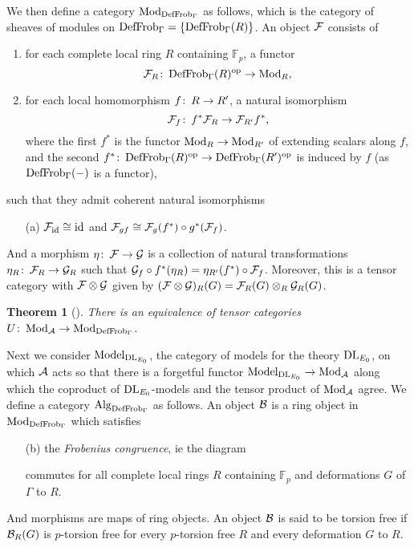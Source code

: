 \documentclass{gtpart}
\newtheorem{thm}{Theorem}
\theoremstyle{definition}
\theoremstyle{remark}
\def\co{\colon\thinspace}
\newcommand{\mb}[1]{\mathbb{#1}}
\newcommand{\DL}{{\rm DL}}
\newcommand{\CA}{{\cal A}}
\newcommand{\Mod}{{\rm Mod}}
\newcommand{\Alg}{{\rm Alg}}
\newcommand{\Frob}{{\rm Frob}}
\newcommand{\DF}{{{\rm DefFrob}_\Gamma}}
\newcommand{\Model}{{\rm Model}}
\begin{document}
We then define a category $\Mod_\DF$ as follows, which is the category 
of sheaves of modules on $\DF = \{\DF(R)\}$.  An object $\cal F$ 
consists of 
\begin{enumerate}
\item for each complete local ring $R$ containing ${\mb F}_p$, a functor
\[
{\cal F}_R\co \DF(R)^{\rm op} \to \Mod_R,
\]
\item for each local homomorphism $f\co R \to R'$, a natural isomorphism 
\[
{\cal F}_f\co f^*{\cal F}_R \to {\cal F}_{R'}f^*,
\]
where the first $f^*$ is the functor $\Mod_R \to \Mod_{R'}$ of extending 
scalars along $f$, and the second 
$f^*\co \DF(R)^{\rm op} \to \DF(R')^{\rm op}$ is induced by $f$ (as 
$\DF(-)$ is a functor),
\end{enumerate}
such that they admit coherent natural isomorphisms
\begin{enumerate}
\item[(a)] ${\cal F}_{\rm id} \cong {\rm id}$ and 
${\cal F}_{gf} \cong {\cal F}_g(f^*) \circ g^*({\cal F}_f)$.  
\end{enumerate}
And a morphism $\eta\co {\cal F} \to {\cal G}$ is a collection of 
natural transformations $\eta_R\co {\cal F}_R \to {\cal G}_R$ such that 
${\cal G}_f \circ f^*(\eta_R) = \eta_{R'}(f^*) \circ {\cal F}_f$.  
Moreover, this is a tensor category with ${\cal F} \otimes {\cal G}$ 
given by $({\cal F} \otimes {\cal G})_R(G) = 
{\cal F}_R(G) \otimes_R {\cal G}_R(G)$.  

\begin{thm}[\cite{lpo}]
There is an equivalence of tensor categories $U\co \Mod_\CA \to \Mod_\DF$.
\end{thm}

Next we consider $\Model_{\DL_{E_0}}$, the category of models for the 
theory $\DL_{E_0}$, on which $\CA$ acts so that 
there is a forgetful functor $\Model_{\DL_{E_0}} \to \Mod_\CA$ along 
which the coproduct of $\DL_{E_0}$-models and the tensor product of 
$\Mod_\CA$ agree.  We define a category $\Alg_\DF$ as follows.  
An object $\cal B$ is a ring object in $\Mod_\DF$ which satisfies
\begin{enumerate}
 \item[(b)] the {\em Frobenius congruence}, ie the diagram
\begin{center}
\end{center}
commutes for all complete local rings $R$ containing ${\mb F}_p$ and 
deformations $G$ of $\Gamma$ to $R$.  
\end{enumerate}
And morphisms are maps of ring 
objects.  An object ${\cal B}$ is said to be torsion free if 
${\cal B}_R(G)$ is $p$-torsion free for every $p$-torsion free $R$ 
and every deformation $G$ to $R$.  
\end{document}
